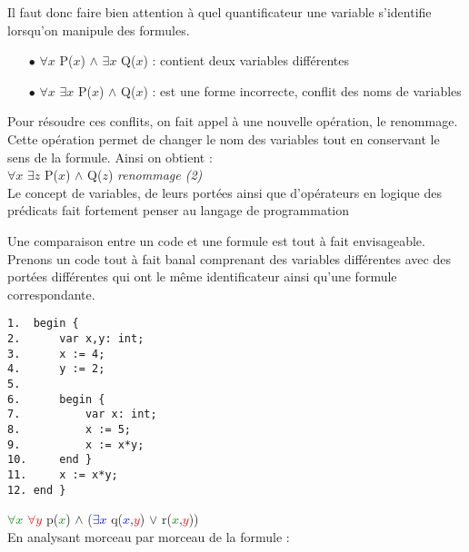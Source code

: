 Il faut donc faire bien attention à quel quantificateur une variable s'identifie lorsqu'on manipule des formules. \\

\begin{itemize}
\item[$\bullet$] $\forall x$ P($x$) $\wedge$ $\exists x$ Q($x$) : contient deux variables différentes\\
 
\item[$\bullet$] $\forall x$ $\exists x$  P($x$) $\wedge$ Q($x$) : est une forme incorrecte, conflit des noms de variables \\
\end{itemize}

Pour résoudre ces conflits, on fait appel à une nouvelle opération, le renommage. Cette opération permet de changer le nom des variables tout en conservant le sens de la formule. Ainsi on obtient : \\

 $\forall x$ $\exists z$  P($x$) $\wedge$ Q($z$)  \textit{renommage (2)} \\
 
 Le concept de variables, de leurs portées ainsi que d'opérateurs en logique des prédicats fait fortement penser au langage de programmation
 
Une comparaison entre un code et une formule est tout à fait envisageable. Prenons un code tout à fait banal comprenant des variables différentes avec des portées différentes qui ont le même identificateur ainsi qu'une formule correspondante. 

\begin{verbatim}
1.  begin {
2.      var x,y: int;        
3.      x := 4;
4.      y := 2;
5.    
6.      begin {
7.          var x: int;
8.          x := 5;
9.          x := x*y;
10.     end }
11.     x := x*y;
12. end }
\end{verbatim}


\textcolor{Green}{$\forall x$} \textcolor{Red}{$\forall y$} p(\textcolor{Green}{$x$}) $\wedge$ (\textcolor{Blue}{$\exists x$}  q(\textcolor{Blue}{$x$},\textcolor{Red}{$y$}) $\vee$ r(\textcolor{Green}{$x$},\textcolor{Red}{$y$}))  \\ 

En analysant morceau par morceau de la formule : \\

